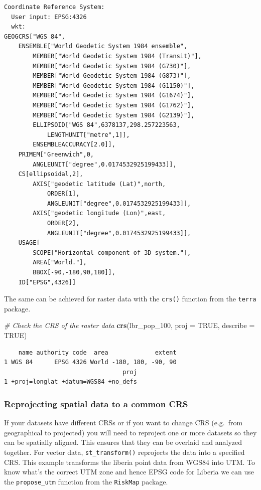 \documentclass[
  letterpaper,
]{krantz}
\newenvironment{Shaded}{\begin{snugshade}}{\end{snugshade}}
\newcommand{\AttributeTok}[1]{\textcolor[rgb]{0.13,0.29,0.53}{#1}}
\newcommand{\CommentTok}[1]{\textcolor[rgb]{0.56,0.35,0.01}{\textit{#1}}}
\newcommand{\ConstantTok}[1]{\textcolor[rgb]{0.56,0.35,0.01}{#1}}
\newcommand{\FunctionTok}[1]{\textcolor[rgb]{0.13,0.29,0.53}{\textbf{#1}}}
\newcommand{\NormalTok}[1]{#1}
\begin{document}
\begin{verbatim}
Coordinate Reference System:
  User input: EPSG:4326 
  wkt:
GEOGCRS["WGS 84",
    ENSEMBLE["World Geodetic System 1984 ensemble",
        MEMBER["World Geodetic System 1984 (Transit)"],
        MEMBER["World Geodetic System 1984 (G730)"],
        MEMBER["World Geodetic System 1984 (G873)"],
        MEMBER["World Geodetic System 1984 (G1150)"],
        MEMBER["World Geodetic System 1984 (G1674)"],
        MEMBER["World Geodetic System 1984 (G1762)"],
        MEMBER["World Geodetic System 1984 (G2139)"],
        ELLIPSOID["WGS 84",6378137,298.257223563,
            LENGTHUNIT["metre",1]],
        ENSEMBLEACCURACY[2.0]],
    PRIMEM["Greenwich",0,
        ANGLEUNIT["degree",0.0174532925199433]],
    CS[ellipsoidal,2],
        AXIS["geodetic latitude (Lat)",north,
            ORDER[1],
            ANGLEUNIT["degree",0.0174532925199433]],
        AXIS["geodetic longitude (Lon)",east,
            ORDER[2],
            ANGLEUNIT["degree",0.0174532925199433]],
    USAGE[
        SCOPE["Horizontal component of 3D system."],
        AREA["World."],
        BBOX[-90,-180,90,180]],
    ID["EPSG",4326]]
\end{verbatim}

The same can be achieved for raster data with the \texttt{crs()}
function from the \texttt{terra} package.

\begin{Shaded}
\begin{Highlighting}[]
\CommentTok{\# Check the CRS of the raster data}
\FunctionTok{crs}\NormalTok{(lbr\_pop\_100, }\AttributeTok{proj =} \ConstantTok{TRUE}\NormalTok{, }\AttributeTok{describe =} \ConstantTok{TRUE}\NormalTok{)}
\end{Highlighting}
\end{Shaded}

\begin{verbatim}
    name authority code  area             extent
1 WGS 84      EPSG 4326 World -180, 180, -90, 90
                                 proj
1 +proj=longlat +datum=WGS84 +no_defs
\end{verbatim}

\subsubsection{Reprojecting spatial data to a common
CRS}\label{reprojecting-spatial-data-to-a-common-crs}

If your datasets have different CRSs or if you want to change CRS
(e.g.~from geographical to projected) you will need to reproject one or
more datasets so they can be spatially aligned. This ensures that they
can be overlaid and analyzed together. For vector data,
\texttt{st\_transform()} reprojects the data into a specified CRS. This
example transforms the liberia point data from WGS84 into UTM. To know
what's the correct UTM zone and hence EPSG code for Liberia we can use
the \texttt{propose\_utm} function from the \texttt{RiskMap} package.
\end{document}
